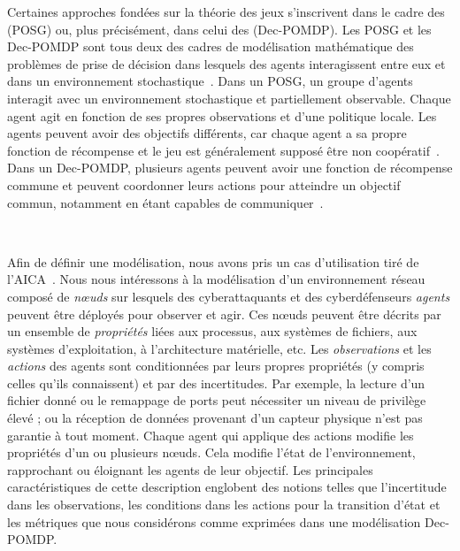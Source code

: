 \noindent
Certaines approches fondées sur la théorie des jeux s'inscrivent dans le cadre des  (POSG) ou, plus précisément, dans celui des  (Dec-POMDP). Les POSG et les Dec-POMDP sont tous deux des cadres de modélisation mathématique des problèmes de prise de décision dans lesquels des agents interagissent entre eux et dans un environnement stochastique~\cite{beynier2010}. Dans un POSG, un groupe d'agents interagit avec un environnement stochastique et partiellement observable. Chaque agent agit en fonction de ses propres observations et d'une politique locale. Les agents peuvent avoir des objectifs différents, car chaque agent a sa propre fonction de récompense et le jeu est généralement supposé être non coopératif~\cite{jk2020}. Dans un Dec-POMDP, plusieurs agents peuvent avoir une fonction de récompense commune et peuvent coordonner leurs actions pour atteindre un objectif commun, notamment en étant capables de communiquer~\cite{bernstein2013}.

\



\noindent
Afin de définir une modélisation, nous avons pris un cas d'utilisation tiré de l'AICA~\cite{theron_autonomous_2021}. Nous nous intéressons à la modélisation d'un environnement réseau composé de \textit{nœuds} sur lesquels des cyberattaquants et des cyberdéfenseurs \textit{agents} peuvent être déployés pour observer et agir. Ces nœuds peuvent être décrits par un ensemble de \textit{propriétés} liées aux processus, aux systèmes de fichiers, aux systèmes d'exploitation, à l'architecture matérielle, etc.
Les \textit{observations} et les \textit{actions} des agents sont conditionnées par leurs propres propriétés (y compris celles qu'ils connaissent) et par des incertitudes. Par exemple, la lecture d'un fichier donné ou le remappage de ports peut nécessiter un niveau de privilège élevé ; ou la réception de données provenant d'un capteur physique n'est pas garantie à tout moment.
Chaque agent qui applique des actions modifie les propriétés d'un ou plusieurs nœuds. Cela modifie l'état de l'environnement, rapprochant ou éloignant les agents de leur objectif.
Les principales caractéristiques de cette description englobent des notions telles que l'incertitude dans les observations, les conditions dans les actions pour la transition d'état et les métriques que nous considérons comme exprimées dans une modélisation Dec-POMDP.

